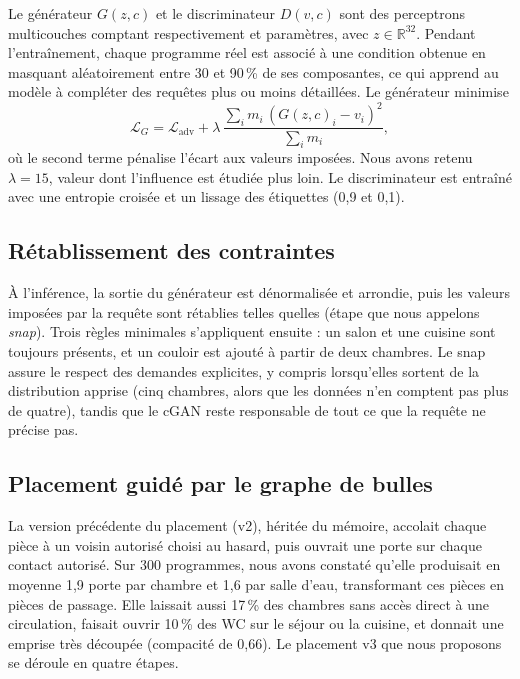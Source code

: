 \documentclass[twocolumn]{ICCKjournal}
\begin{document}
Le générateur $G(z,c)$ et le discriminateur $D(v,c)$ sont des
perceptrons multicouches comptant respectivement \resParamsG{} et
\resParamsD{} paramètres, avec $z\in\mathbb{R}^{32}$. Pendant
l'entraînement, chaque programme réel est associé à une condition
obtenue en masquant aléatoirement entre 30 et 90\,\% de ses composantes,
ce qui apprend au modèle à compléter des requêtes plus ou moins
détaillées. Le générateur minimise
\begin{equation}
  \mathcal{L}_G = \mathcal{L}_{\text{adv}}
     + \lambda\,\frac{\sum_i m_i\,(G(z,c)_i - v_i)^2}{\sum_i m_i},
  \label{eq:loss}
\end{equation}
où le second terme pénalise l'écart aux valeurs imposées. Nous avons
retenu $\lambda=15$, valeur dont l'influence est étudiée plus loin. Le
discriminateur est entraîné avec une entropie croisée et un lissage des
étiquettes (0,9 et 0,1).

\subsection{Rétablissement des contraintes}

À l'inférence, la sortie du générateur est dénormalisée et arrondie,
puis les valeurs imposées par la requête sont rétablies telles quelles
(étape que nous appelons \emph{snap}). Trois règles minimales
s'appliquent ensuite : un salon et une cuisine sont toujours présents,
et un couloir est ajouté à partir de deux chambres. Le snap assure le
respect des demandes explicites, y compris lorsqu'elles sortent de la
distribution apprise (cinq chambres, alors que les données n'en
comptent pas plus de quatre), tandis que le cGAN reste responsable de
tout ce que la requête ne précise pas.

\subsection{Placement guidé par le graphe de bulles}
\label{sec:placement}

La version précédente du placement (v2), héritée du mémoire, accolait
chaque pièce à un voisin autorisé choisi au hasard, puis ouvrait une
porte sur chaque contact autorisé. Sur 300 programmes, nous avons
constaté qu'elle produisait en moyenne 1,9 porte par chambre et 1,6 par
salle d'eau, transformant ces pièces en pièces de passage. Elle laissait
aussi 17\,\% des chambres sans accès direct à une circulation, faisait
ouvrir 10\,\% des WC sur le séjour ou la cuisine, et donnait une emprise
très découpée (compacité de 0,66). Le placement v3 que nous proposons se
déroule en quatre étapes.
\end{document}
